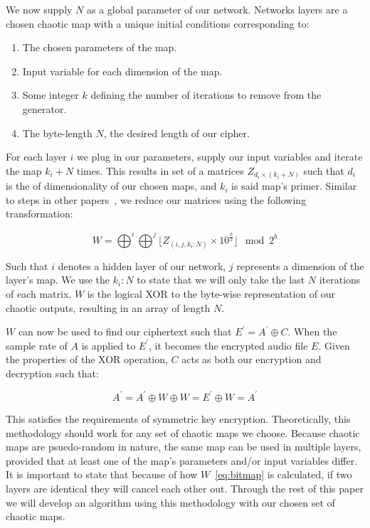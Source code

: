 \documentclass[conference]{IEEEtran}
\begin{document}
We now supply $N$ as a global parameter of our network.
Networks layers are a chosen chaotic map with a unique initial conditions corresponding to:

\begin{mdframed}
\begin{enumerate}
    \item The chosen parameters of the map.
    \item Input variable for each dimension of the map.
    \item Some integer $k$ defining the number of iterations to remove from the generator.
    \item The byte-length $N$, the desired length of our cipher.
\end{enumerate}
\end{mdframed}

For each layer $i$ we plug in our parameters, supply our input variables and iterate the map $k_i+N$ times.
This results in set of a matrices $Z_{d_i \times (k_i+N)}$ such that $d_i$ is the of dimensionality of our chosen maps, and $k_i$ is said map's primer.
Similar to steps in other papers~\cite{Lokesh,app112110190}, we reduce our matrices using the following transformation:

\begin{equation}\label{eq:bitmap}
    W = \bigoplus^{i} \bigoplus^{j} \big\lfloor  Z_{(i, j, k_i:N)} \times 10^{\frac{b}{2}} \big\rfloor \mod 2^{b}
\end{equation}

Such that $i$ denotes a hidden layer of our network, $j$ represents a dimension of the layer's map.
We use the $k_i:N$ to state that we will only take the last $N$ iterations of each matrix.
$W$ is the logical XOR to the byte-wise representation of our chaotic outputs, resulting in an array of length ${N}$.

$W$ can now be used to find our ciphertext such that $E^\prime=A^\prime \oplus C$.
When the sample rate of $A$ is applied to $E^\prime$, it becomes the encrypted audio file $E$.
Given the properties of the XOR operation, $C$ acts as both our encryption and decryption such that:

\begin{equation}\label{eq:xored}
    A^\prime = A^\prime \oplus W \oplus W = E^\prime \oplus W = A^\prime
\end{equation}

This satisfies the requirements of symmetric key encryption.
Theoretically, this methodology should work for any set of chaotic maps we choose.
Because chaotic maps are psuedo-random in nature, the same map can be used in multiple layers, provided that at least one of the map's parameters and/or input variables differ.
It is important to state that because of how $W$~\eqref{eq:bitmap} is calculated, if two layers are identical they will cancel each other out.
Through the rest of this paper we will develop an algorithm using this methodology with our chosen set of chaotic maps.
\end{document}
